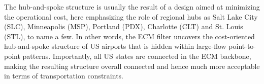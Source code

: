 \documentclass[aps,twocolumn,superscriptaddress]{revtex4-1}
\begin{document}
The hub-and-spoke structure is usually the result of a design aimed at minimizing the operational cost, here emphasizing the role of regional hubs as Salt Lake City (SLC), Minneapolis (MSP), Portland (PDX), Charlotte (CLT) and St. Louis (STL), to name a few. 
In other words, the ECM filter uncovers the cost-oriented hub-and-spoke structure of US airports that is hidden within large-flow point-to-point patterns.
Importantly, all US states are connected in the ECM backbone, making the resulting structure overall connected and hence much more acceptable in terms of transportation constraints.
%
% 
% 
%
\end{document}
